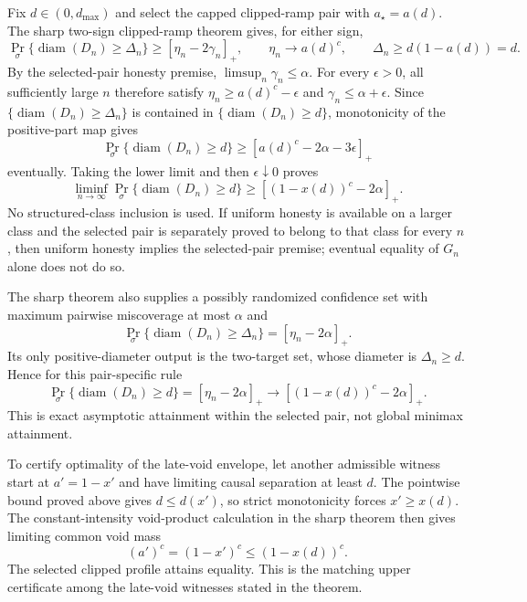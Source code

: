 Fix \(d\in(0,d_{\max})\) and select the capped clipped-ramp pair with \(a_\star=a(d)\).  The sharp two-sign clipped-ramp theorem gives, for either sign,
\[
 \Pr_\sigma\{\operatorname{diam}(D_n)\ge\Delta_n\}
 \ge[\eta_n-2\gamma_n]_+,
 \qquad
 \eta_n\longrightarrow a(d)^c,
 \qquad
 \Delta_n\ge d(1-a(d))=d.
\]
By the selected-pair honesty premise, \(\limsup_n\gamma_n\le\alpha\).  For every \(\epsilon>0\), all sufficiently large \(n\) therefore satisfy \(\eta_n\ge a(d)^c-\epsilon\) and \(\gamma_n\le\alpha+\epsilon\).  Since \(\{\operatorname{diam}(D_n)\ge\Delta_n\}\) is contained in \(\{\operatorname{diam}(D_n)\ge d\}\), monotonicity of the positive-part map gives
\[
 \Pr_\sigma\{\operatorname{diam}(D_n)\ge d\}
 \ge[a(d)^c-2\alpha-3\epsilon]_+
\]
eventually.  Taking the lower limit and then \(\epsilon\downarrow0\) proves
\[
 \liminf_{n\to\infty}\Pr_\sigma\{\operatorname{diam}(D_n)\ge d\}
 \ge[(1-x(d))^c-2\alpha]_+.
\]
No structured-class inclusion is used.  If uniform honesty is available on a larger class and the selected pair is separately proved to belong to that class for every \(n\), then uniform honesty implies the selected-pair premise; eventual equality of \(G_n\) alone does not do so.

The sharp theorem also supplies a possibly randomized confidence set with maximum pairwise miscoverage at most \(\alpha\) and
\[
 \Pr_\sigma\{\operatorname{diam}(D_n)\ge\Delta_n\}
 =[\eta_n-2\alpha]_+.
\]
Its only positive-diameter output is the two-target set, whose diameter is \(\Delta_n\ge d\).  Hence for this pair-specific rule
\[
 \Pr_\sigma\{\operatorname{diam}(D_n)\ge d\}
 =[\eta_n-2\alpha]_+
 \longrightarrow[(1-x(d))^c-2\alpha]_+.
\]
This is exact asymptotic attainment within the selected pair, not global minimax attainment.

To certify optimality of the late-void envelope, let another admissible witness start at \(a'=1-x'\) and have limiting causal separation at least \(d\).  The pointwise bound proved above gives \(d\le d(x')\), so strict monotonicity forces \(x'\ge x(d)\).  The constant-intensity void-product calculation in the sharp theorem then gives limiting common void mass
\[
 (a')^c=(1-x')^c\le(1-x(d))^c.
\]
The selected clipped profile attains equality.  This is the matching upper certificate among the late-void witnesses stated in the theorem.

